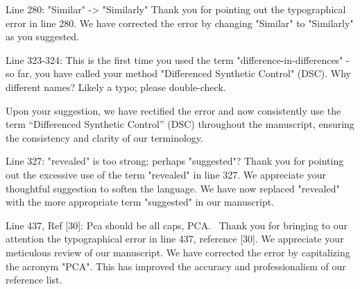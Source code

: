 \RC{} Line 280: "Similar" -> "Similarly"
\AR{} Thank you for pointing out the typographical error in line 280. We have corrected the error by changing "Similar" to "Similarly" as you suggested.

\RC{} Line 323-324: This is the first time you used the term "difference-in-differences" - so far, you have called your method "Differenced Synthetic Control" (DSC). Why different names? Likely a typo; please double-check.

\AR{} Upon your suggestion, we have rectified the error and now consistently use the term ``Differenced Synthetic Control'' (DSC) throughout the manuscript, ensuring the consistency and clarity of our terminology.

\RC{} Line 327: "revealed" is too strong; perhaps "suggested"?
\AR{} Thank you for pointing out the excessive use of the term "revealed" in line 327. We appreciate your thoughtful suggestion to soften the language. We have now replaced "revealed" with the more appropriate term "suggested" in our manuscript.

\RC{} Line 437, Ref [30]: Pca should be all caps, PCA.\
\AR{} Thank you for bringing to our attention the typographical error in line 437, reference [30]. We appreciate your meticulous review of our manuscript. We have corrected the error by capitalizing the acronym "PCA". This has improved the accuracy and professionalism of our reference list.


